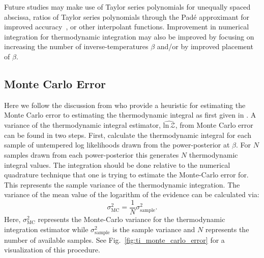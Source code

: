 Future studies may make use of Taylor series polynomials for unequally spaced abscissa, ratios of Taylor series polynomials through the Pad$\textrm{\'e}$ approximant for improved accuracy~\citep{press1992pade}, or other interpolant functions. Improvement in numerical integration for thermodynamic integration may also be improved by focusing on increasing the number of inverse-temperatures $\beta$ and/or by improved placement of $\beta$.

\subsection{Monte Carlo Error}
Here we follow the discussion from \cite{annis2019thermodynamic} who provide a heuristic for estimating the Monte Carlo error to estimating the thermodynamic integral as first given in \cite{friel2008marginal}. A variance of the thermodynamic integral estimator, $\widehat{\mathrm{ln} \, \mathcal{Z}}$, from Monte Carlo error can be found in two steps. First, calculate the thermodynamic integral for each sample of untempered log likelihoods drawn from the power-posterior at $\beta$. For $N$ samples drawn from each power-posterior this generates $N$ thermodynamic integral values. The integration should be done relative to the numerical quadrature technique that one is trying to estimate the Monte-Carlo error for. This represents the sample variance of the thermodynamic integration. The variance of the mean value of the logarithm of the evidence can be calculated via:
\begin{equation}
    \sigma^2_{\mathrm{MC}} = \frac{1}{N} \sigma^2_{\mathrm{sample}}.
\end{equation}
Here, $\sigma^2_{\mathrm{MC}}$ represents the Monte-Carlo variance for the thermodynamic integration estimator while $\sigma^2_{\mathrm{sample}}$ is the sample variance and $N$ represents the number of available samples. See Fig.~\ref{fig:ti_monte_carlo_error} for a visualization of this procedure.

